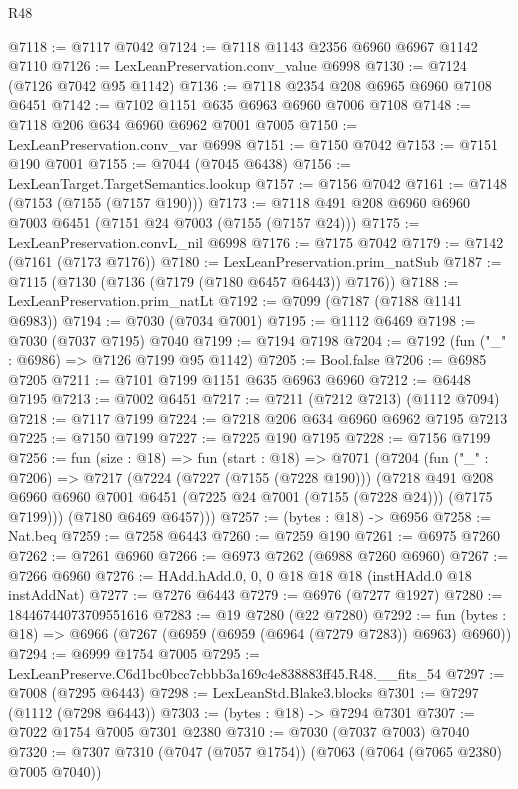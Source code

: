 \begin{lexlean}{R48}
\begin{coremodule}
@7118 := @7117 @7042
@7124 := @7118 @1143 @2356 @6960 @6967 @1142 @7110
@7126 := LexLeanPreservation.conv_value @6998
@7130 := @7124 (@7126 @7042 @95 @1142)
@7136 := @7118 @2354 @208 @6965 @6960 @7108 @6451
@7142 := @7102 @1151 @635 @6963 @6960 @7006 @7108
@7148 := @7118 @206 @634 @6960 @6962 @7001 @7005
@7150 := LexLeanPreservation.conv_var @6998
@7151 := @7150 @7042
@7153 := @7151 @190 @7001
@7155 := @7044 (@7045 @6438)
@7156 := LexLeanTarget.TargetSemantics.lookup
@7157 := @7156 @7042
@7161 := @7148 (@7153 (@7155 (@7157 @190)))
@7173 := @7118 @491 @208 @6960 @6960 @7003 @6451 (@7151 @24 @7003 (@7155 (@7157 @24)))
@7175 := LexLeanPreservation.convL_nil @6998
@7176 := @7175 @7042
@7179 := @7142 (@7161 (@7173 @7176))
@7180 := LexLeanPreservation.prim_natSub
@7187 := @7115 (@7130 (@7136 (@7179 (@7180 @6457 @6443)) @7176))
@7188 := LexLeanPreservation.prim_natLt
@7192 := @7099 (@7187 (@7188 @1141 @6983))
@7194 := @7030 (@7034 @7001)
@7195 := @1112 @6469
@7198 := @7030 (@7037 @7195) @7040
@7199 := @7194 @7198
@7204 := @7192 (fun ("_" : @6986) => @7126 @7199 @95 @1142)
@7205 := Bool.false
@7206 := @6985 @7205
@7211 := @7101 @7199 @1151 @635 @6963 @6960
@7212 := @6448 @7195
@7213 := @7002 @6451
@7217 := @7211 (@7212 @7213) (@1112 @7094)
@7218 := @7117 @7199
@7224 := @7218 @206 @634 @6960 @6962 @7195 @7213
@7225 := @7150 @7199
@7227 := @7225 @190 @7195
@7228 := @7156 @7199
@7256 := fun (size : @18) =>
  fun (start : @18) =>
  @7071
    (@7204
      (fun ("_" : @7206) =>
      @7217
        (@7224
          (@7227 (@7155 (@7228 @190)))
          (@7218
            @491
            @208
            @6960
            @6960
            @7001
            @6451
            (@7225 @24 @7001 (@7155 (@7228 @24)))
            (@7175 @7199)))
        (@7180 @6469 @6457)))
@7257 := (bytes : @18) -> @6956
@7258 := Nat.beq
@7259 := @7258 @6443
@7260 := @7259 @190
@7261 := @6975 @7260
@7262 := @7261 @6960
@7266 := @6973 @7262 (@6988 @7260 @6960)
@7267 := @7266 @6960
@7276 := HAdd.hAdd.{0, 0, 0} @18 @18 @18 (instHAdd.{0} @18 instAddNat)
@7277 := @7276 @6443
@7279 := @6976 (@7277 @1927)
@7280 := 18446744073709551616
@7283 := @19 @7280 (@22 @7280)
@7292 := fun (bytes : @18) => @6966 (@7267 (@6959 (@6959 (@6964 (@7279 @7283)) @6963) @6960))
@7294 := @6999 @1754 @7005
@7295 := LexLeanPreserve.C6d1bc0bcc7cbbb3a169c4e838883ff45.R48.__fits_54
@7297 := @7008 (@7295 @6443)
@7298 := LexLeanStd.Blake3.blocks
@7301 := @7297 (@1112 (@7298 @6443))
@7303 := (bytes : @18) -> @7294 @7301
@7307 := @7022 @1754 @7005 @7301 @2380
@7310 := @7030 (@7037 @7003) @7040
@7320 := @7307 @7310 (@7047 (@7057 @1754)) (@7063 (@7064 (@7065 @2380) @7005 @7040))

\end{coremodule}
\end{lexlean}
